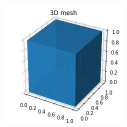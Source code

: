 \begin{frame}[fragile]
\begin{minipage}{0.49\textwidth}
\begin{center}
    \includegraphics[width=\textwidth]{png/matplotlib_3D_mesh.png}
\end{center}
 \end{minipage}


\end{frame}


